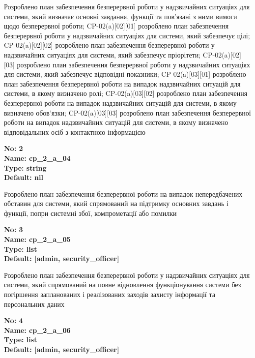 \documentclass{article}
\begin{document}
{\footnotesize Розроблено план забезпечення безперервної роботи у надзвичайних ситуаціях для системи, який визначає основні завдання, функції та пов'язані з ними вимоги щодо безперервної роботи; CP-02(a)[02][01] розроблено план забезпечення безперервної роботи у надзвичайних ситуаціях для системи, який забезпечує цілі; CP-02(a)[02][02] розроблено план забезпечення безперервної роботи у надзвичайних ситуаціях для системи, який забезпечує пріорітети; CP-02(a)[02][03] розроблено план забезпечення безперервної роботи у надзвичайних ситуаціях для системи, який забезпечує відповідні показники; CP-02(a)[03][01] розроблено план забезпечення безперервної роботи на випадок надзвичайних ситуацій для системи, в якому визначено ролі; CP-02(a)[03][02] розроблено план забезпечення безперервної роботи на випадок надзвичайних ситуацій для системи, в якому визначено обов'язки; CP-02(a)[03][03] розроблено план забезпечення безперервної роботи на випадок надзвичайних ситуацій для системи, в якому визначено відповідальних осіб з контактною інформацією}


{\footnotesize\bfseries
No: 2\\
Name: cp\_\allowbreak{}2\_\allowbreak{}a\_\allowbreak{}04\\
Type: string\\
Default: nil
}

{\footnotesize Розроблено план забезпечення безперервної роботи на випадок непередбачених обставин для системи, який спрямований на підтримку основних завдань і функції, попри системні збої, компрометації або помилки}


{\footnotesize\bfseries
No: 3\\
Name: cp\_\allowbreak{}2\_\allowbreak{}a\_\allowbreak{}05\\
Type: list\\
Default: [\textquotedbl{}admin\textquotedbl{}, \textquotedbl{}security\_\allowbreak{}officer\textquotedbl{}]
}

{\footnotesize Розроблено план забезпечення безперервної роботи у надзвичайних ситуаціях для системи, який спрямований на повне відновлення функціонування системи без погіршення запланованих і реалізованих заходів захисту інформації та персональних даних}


{\footnotesize\bfseries
No: 4\\
Name: cp\_\allowbreak{}2\_\allowbreak{}a\_\allowbreak{}06\\
Type: list\\
Default: [\textquotedbl{}admin\textquotedbl{}, \textquotedbl{}security\_\allowbreak{}officer\textquotedbl{}]
}
\end{document}
